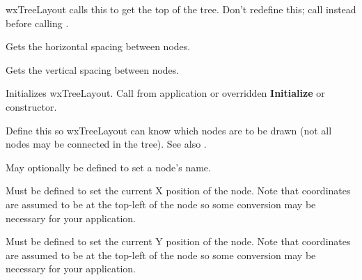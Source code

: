 

wxTreeLayout calls this to get the top of the tree. Don't redefine this; call
\rtfsp{} instead before calling .



Gets the horizontal spacing between nodes.



Gets the vertical spacing between nodes.



Initializes wxTreeLayout. Call from application or overridden {\bf Initialize}
or constructor.

\label{nodeactive}


Define this so wxTreeLayout can know which nodes are to be drawn (not all
nodes may be connected in the tree). See also .



May optionally be defined to set a node's name.



Must be defined to set the current X position of the node. Note that
coordinates are assumed to be at the top-left of the node so some conversion
may be necessary for your application.



Must be defined to set the current Y position of the node. Note that
coordinates are assumed to be at the top-left of the node so some conversion
may be necessary for your application.

